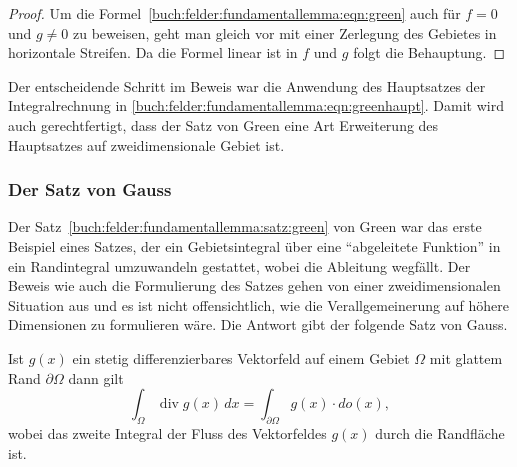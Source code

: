 \begin{proof}
Um die Formel~\eqref{buch:felder:fundamentallemma:eqn:green} auch
für $f=0$ und $g\ne 0$ zu beweisen, geht man gleich vor mit 
einer Zerlegung des Gebietes in horizontale Streifen.
Da die Formel linear ist in $f$ und $g$ folgt die Behauptung.
\end{proof}

Der entscheidende Schritt im Beweis war die Anwendung des Hauptsatzes
der Integralrechnung in
\eqref{buch:felder:fundamentallemma:eqn:greenhaupt}.
Damit wird auch gerechtfertigt, dass der Satz von Green eine Art
Erweiterung des Hauptsatzes auf zweidimensionale Gebiet ist.

%
%
\subsubsection{Der Satz von Gauss}

Der Satz~\ref{buch:felder:fundamentallemma:satz:green} von Green
war das erste Beispiel eines Satzes, der ein Gebietsintegral über eine
``abgeleitete Funktion'' in ein Randintegral umzuwandeln gestattet, wobei
die Ableitung wegfällt.
Der Beweis wie auch die Formulierung des Satzes gehen von einer
zweidimensionalen Situation aus und es ist nicht offensichtlich,
wie die Verallgemeinerung auf höhere Dimensionen zu formulieren wäre.
Die Antwort gibt der folgende Satz von Gauss.

\begin{satz}[Gauss]
\label{buch:felder:fundamentallemma:satz:gauss}
Ist $g(x)$ ein stetig differenzierbares Vektorfeld auf einem Gebiet
$\Omega$ mit glattem Rand $\partial\Omega$ dann gilt
\begin{equation}
\int_\Omega \operatorname{div}g(x)\,dx
=
\int_{\partial\Omega} g(x)\cdot do(x),
\label{buch:felder:fundamentallemma:eqn:gauss}
\end{equation}
wobei das zweite Integral der Fluss des Vektorfeldes $g(x)$ durch
die Randfläche ist.
\end{satz}

